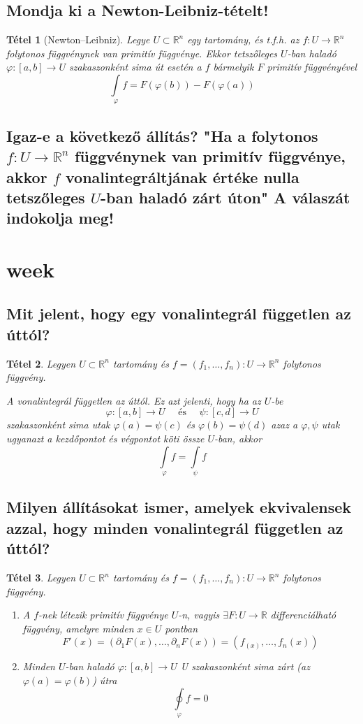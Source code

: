 \documentclass[12pt,a4paper]{article}
\newcommand{\R}{\mathbb{R}}
\newcommand{\f}{\varphi}
\newcommand{\bb}[1]{\left( #1 \right)}
\newcommand{\boxes}[1]{\left[ #1 \right]}
\newtheorem{tet}{Tétel}[section]
\begin{document}
\subsection{Mondja ki a Newton-Leibniz-tételt!}
\begin{tet}[Newton–Leibniz]
Legye $U \subset \R^n$ egy tartomány, és t.f.h. az $f : U \to \R^n$
folytonos függvénynek van primitív függvénye. Ekkor tetszőleges $U$-ban haladó $\f : [a, b] \to U$ szakaszonként sima út esetén a $f$ bármelyik $F$ primitív függvényével
\[
\int\limits_\f f = F(\f(b))-F(\f(a))
\]
\end{tet}
\subsection{Igaz-e a következő állítás? "Ha a folytonos $f : U \to \R^n$ függvénynek van primitív függvénye, akkor $f$ vonalintegráltjának értéke nulla tetszőleges $U$-ban haladó zárt úton" A válaszát indokolja meg!}
\newpage
\section{week}
\subsection{Mit jelent, hogy egy vonalintegrál független az úttól?}
\begin{tet}
Legyen $U \subset \R^n$ tartomány és $f = (f_1,\ldots,f_n): U \to \R^n$ folytonos függvény.

A vonalintegrál független az úttól. Ez azt jelenti, hogy ha az $U$-be
\[
\f : \boxes{a,b} \to U \quad \text{ és } \quad \psi : \boxes{c,d} \to U
\]
szakaszonként sima utak $\f(a) = \psi(c)$ és $\f(b) = \psi(d)$ azaz a $\f,\psi$ utak ugyanazt a kezdőpontot és végpontot köti össze $U$-ban, akkor
\[
\int\limits_\f f = \int\limits_\psi f
\]
\end{tet}
\subsection{Milyen állításokat ismer, amelyek ekvivalensek azzal, hogy minden vonalintegrál független az úttól?}
\begin{tet}
Legyen $U \subset \R^n$ tartomány és $f = (f_1,\ldots,f_n): U \to \R^n$ folytonos függvény.
\begin{enumerate}
\item A $f$-nek létezik primitív függvénye $U$-n, vagyis $\exists F : U \to \R$ differenciálható függvény, amelyre minden $x \in U$ pontban
\[
F'(x) = \bb{\partial_1F(x),\ldots,\partial_nF(x)} = \bb{f_(x),\ldots,f_n(x)}
\]
\item Minden $U$-ban haladó $\f : \boxes{a,b} \to U $ U szakaszonként sima zárt (az $\f(a) = \f(b)$) útra
\[
\oint\limits_\f f = 0
\]
\end{enumerate}
\end{tet}
\end{document}
